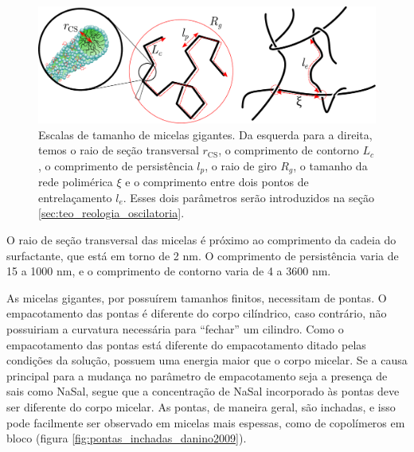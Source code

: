 		\begin{figure}[h]
			\centering
			\includegraphics[width=\textwidth]{imagens/artigos/escalas_tamanho_MG}
			\caption{Escalas de tamanho de micelas gigantes. Da esquerda para a direita, temos o raio de seção transversal \(r_\mathrm{CS}\), o comprimento de contorno \(L_c\), o comprimento de persistência \(l_p\), o raio de giro \(R_g\), o tamanho da rede polimérica \(\xi\) e o comprimento entre dois pontos de entrelaçamento \(l_e\). Esses dois parâmetros serão introduzidos na seção \ref{sec:teo_reologia_oscilatoria}.}
			\label{fig:escalas_tamanho_mg}
		\end{figure}
		
		O raio de seção transversal das micelas é próximo ao comprimento da cadeia do surfactante, que está em torno de 2 nm. O comprimento de persistência varia de 15 a 1000 nm, e o comprimento de contorno varia de 4 a 3600 nm. %
		
		As micelas gigantes, por possuírem tamanhos finitos, necessitam de pontas. O empacotamento das pontas é diferente do corpo cilíndrico, caso contrário, não possuiriam a curvatura necessária para ``fechar'' um cilindro. Como o empacotamento das pontas está diferente do empacotamento ditado pelas condições da solução, possuem uma energia maior que o corpo micelar. Se a causa principal para a mudança no parâmetro de empacotamento seja a presença de sais como NaSal, segue que a concentração de NaSal incorporado às pontas deve ser diferente do corpo micelar. As pontas, de maneira geral, são inchadas, e isso pode facilmente ser observado em micelas mais espessas, como de copolímeros em bloco (figura \ref{fig:pontas_inchadas_danino2009}). 
		
